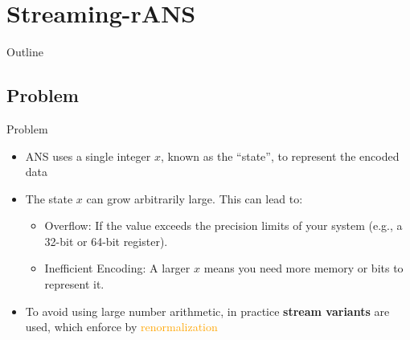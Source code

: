 \section{Streaming-rANS}

\begin{frame}{Outline}
    \tableofcontents[
        currentsection, 
        sectionstyle=show/hide, 
        subsectionstyle=show/show/hide, 
        subsubsectionstyle=show/hide/show]
\end{frame}


\subsection{Problem}
    \begin{frame}[fragile]{Problem}
        \begin{itemize}
            \item<1-> ANS uses a single integer $\mathit{x}$, known as the “state”, to represent the encoded data
            \item<2-> The state $\mathit{x}$ can grow arbitrarily large. This can lead to:
            \begin{itemize}
                \item Overflow: If the value exceeds the precision limits of your system (e.g., a 32-bit or 64-bit register).
                \item Inefficient Encoding: A larger $\mathit{x}$ means you need more memory or bits to represent it.
            \end{itemize}
            \item<3-> To avoid using large number arithmetic, in practice \textbf{stream variants} are used, which enforce by \textcolor{orange}{renormalization}
        \end{itemize}
    \end{frame}


